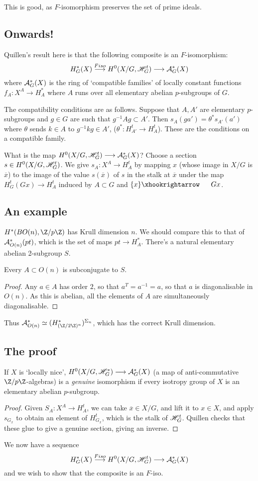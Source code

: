 \documentclass[11pt]{article}
\begin{document}
\begin{JeremyQuillen}
This is good, as $F$-isomorphism preserves the set of prime ideals.
\subsection*{Onwards!}
Quillen's result here is that the following composite is an $F$-isomorphism:
\[H^*_G(X)\overset{Fiso}{\longrightarrow} H^0(X/G,\mathscr{H}_G^t)\longrightarrow\mathcal{A}_G^*(X)\]
where $\mathcal{A}_G^*(X)$ is the ring of `compatible families' of locally constant functions $f_A:X^A\to H^*_A$ where $A$ runs over all elementary abelian $p$-subgroups of $G$.

The compatibility conditions are as follows. Suppose that $A,A'$ are elementary $p$-subgroups and $g\in G$ are such that $g^{-1}Ag\subset A'$. Then $s_A(ga')=\theta^*s_{A'}(a')$ where $\theta$ sends $k\in A$ to $g^{-1}kg\in A'$, ($\theta^*:H^t_{A'}\to H^t_A$). These are the conditions on a compatible family.

What is the map $H^0(X/G,\mathscr{H}_G^t)\longrightarrow \mathcal{A}_G^*(X)$? Choose a section $s\in H^0(X/G,\mathscr{H}_G^t)$. We give $s_A:X^A\to H_A^t$ by mapping $x$ (whose image in $X/G$ is $\overline x$) to the image of the value $s(\overline x)$ of $s$ in the stalk at $\overline x$ under the map $H^t_G(Gx)\to H^t_A$ induced by $A\subset G$ and $\{x\}\cofibration Gx$.
\subsection*{An example}
$H^*(BO(n),\Z/p\Z)$ has Krull dimension $n$. We should compare this to that of $\mathcal{A}_{O(n)}^*(pt)$, which is the set of maps $pt\to H^*_A$. There's a natural elementary abelian 2-subgroup $S$. 
\begin{claim}
Every $A\subset O(n)$ is subconjugate to $S$.
\end{claim}
\begin{proof}
Any $a\in A$ has order $2$, so that $a^T=a^{-1}=a$, so that $a$ is diagonalisable in $O(n)$. As this is abelian, all the elements of $A$ are simultaneously diagonalisable.
\end{proof}
Thus $\calA^*_{O(n)}\simeq (H^*_{(\Z/2\Z)^n})^{\Sigma_n}$, which has the correct Krull dimension.
\subsection*{The proof}
\begin{prop*}
If $X$ is `locally nice', $H^0(X/G,\mathscr{H}^*_G)\longrightarrow\mathcal{A}_G^*(X)$ (a map of anti-commutative $\Z/p\Z$-algebras) is a \emph{genuine} isomorphism if every isotropy group of $X$ is an elementary abelian $p$-subgroup.
\end{prop*}
\begin{proof}
Given $S_A:X^A\to H^t_A$, we can take $\overline x\in X/G$, and lift it to $x\in X$, and apply $s_{G_x}$ to obtain an element of $H^t_{G_x}$, which is the stalk of $\mathscr{H}^t_G$. Quillen checks that these glue to give a genuine section, giving an inverse.
\end{proof}
We now have a sequence
\[H^*_G(X)\overset{Fiso}{\longrightarrow} H^0(X/G,\mathscr{H}_G^t)\longrightarrow\mathcal{A}_G^*(X)\]
and we wish to show that the composite is an $F$-iso.


\end{JeremyQuillen}
\end{document}
